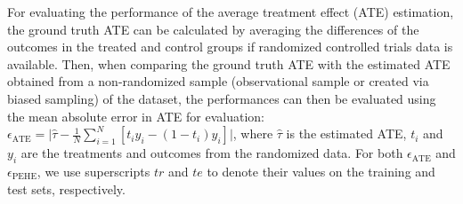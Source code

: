 \documentclass[letterpaper]{article} %
\begin{document}
%

For evaluating the performance of the average treatment effect (ATE) estimation, the ground truth ATE can be calculated by averaging the differences of the outcomes in the treated and control groups if randomized controlled trials data is available. Then, when comparing the ground truth ATE with the estimated ATE obtained from a non-randomized sample (observational sample or created via biased sampling) of the dataset, the performances can then be evaluated using the mean absolute error in ATE \cite{Hill2011,Shalit2016,Louizos2017,Yao2018_Twin} for evaluation: $\epsilon_{\text{ATE}} = \vert \hat{\tau} - \frac{1}{N}\sum\limits_{i=1}^N[t_i y_i - (1-t_i)y_i]\vert$, 
where $\hat{\tau}$ is the estimated ATE, $t_i$ and $y_i$ are the treatments and outcomes from the randomized data. For both $\epsilon_{\text{ATE}}$ and $\epsilon_{\text{PEHE}}$, we use superscripts $tr$ and $te$ to denote their values on the training and test sets, respectively.
\end{document}
